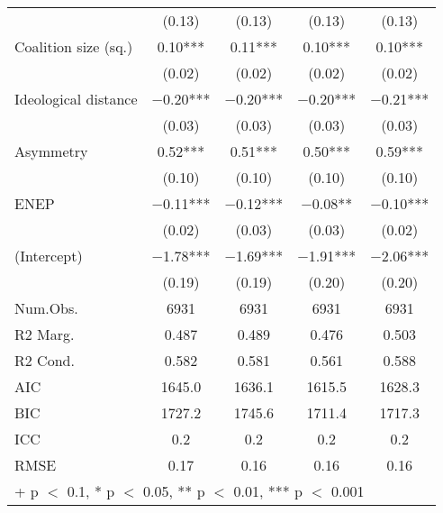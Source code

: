 \begin{table}
\begin{tabular}[t]{lcccc}
 & (\num{0.13}) & (\num{0.13}) & (\num{0.13}) & (\num{0.13})\\
Coalition size (sq.) & \num{0.10}*** & \num{0.11}*** & \num{0.10}*** & \num{0.10}***\\
 & (\num{0.02}) & (\num{0.02}) & (\num{0.02}) & (\num{0.02})\\
Ideological distance & \num{-0.20}*** & \num{-0.20}*** & \num{-0.20}*** & \num{-0.21}***\\
 & (\num{0.03}) & (\num{0.03}) & (\num{0.03}) & (\num{0.03})\\
Asymmetry & \num{0.52}*** & \num{0.51}*** & \num{0.50}*** & \num{0.59}***\\
 & (\num{0.10}) & (\num{0.10}) & (\num{0.10}) & (\num{0.10})\\
ENEP & \num{-0.11}*** & \num{-0.12}*** & \num{-0.08}** & \num{-0.10}***\\
 & (\num{0.02}) & (\num{0.03}) & (\num{0.03}) & (\num{0.02})\\
(Intercept) & \num{-1.78}*** & \num{-1.69}*** & \num{-1.91}*** & \num{-2.06}***\\
 & (\num{0.19}) & (\num{0.19}) & (\num{0.20}) & (\num{0.20})\\
\midrule
Num.Obs. & \num{6931} & \num{6931} & \num{6931} & \num{6931}\\
R2 Marg. & \num{0.487} & \num{0.489} & \num{0.476} & \num{0.503}\\
R2 Cond. & \num{0.582} & \num{0.581} & \num{0.561} & \num{0.588}\\
AIC & \num{1645.0} & \num{1636.1} & \num{1615.5} & \num{1628.3}\\
BIC & \num{1727.2} & \num{1745.6} & \num{1711.4} & \num{1717.3}\\
ICC & \num{0.2} & \num{0.2} & \num{0.2} & \num{0.2}\\
RMSE & \num{0.17} & \num{0.16} & \num{0.16} & \num{0.16}\\
\bottomrule
\multicolumn{5}{l}{\rule{0pt}{1em}+ p $<$ 0.1, * p $<$ 0.05, ** p $<$ 0.01, *** p $<$ 0.001}\\
\end{tabular}
\end{table}
